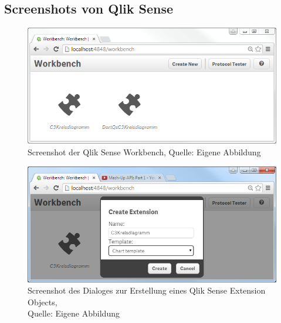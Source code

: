 \begin{appendix}
\newpage
\subsection{Screenshots von Qlik Sense} 
\label{lab:ScreenshotsVonQlikSense} 

\begin{figure}[htbp]
	\centering
		\includegraphics[width=1.00\textwidth]{img/SenseScreenshots/Workbench.PNG}
	\caption[Screenshot der Qlik Sense Workbench]{Screenshot der Qlik Sense Workbench, Quelle: Eigene Abbildung}
	\label{fig:Workbench}
\end{figure}

\begin{figure}[htbp]
	\centering
		\includegraphics[width=1.00\textwidth]{img/SenseScreenshots/WorkbenchCreateNew.PNG}
	\caption[Screenshot des Dialoges zur Erstellung eines Qlik Sense Extension Objects]{Screenshot des Dialoges zur Erstellung eines Qlik Sense Extension Objects, \\Quelle: Eigene Abbildung}
	\label{fig:WorkbenchCreateNew}
\end{figure}

\newpage


\end{appendix}
